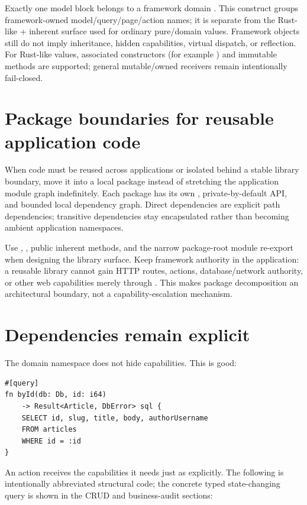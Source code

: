 Exactly one model block belongs to a framework domain . This construct groups framework-owned model/query/page/action names; it is separate from the Rust-like  + inherent  surface used for ordinary pure/domain values. Framework objects still do not imply inheritance, hidden capabilities, virtual dispatch, or reflection. For Rust-like values, associated constructors (for example ) and immutable  methods are supported; general mutable/owned receivers remain intentionally fail-closed.


\section{Package boundaries for reusable application code}

When code must be reused across applications or isolated behind a stable library boundary, move it into a local package instead of stretching the application module graph indefinitely. Each package has its own , private-by-default API, and bounded local dependency graph. Direct dependencies are explicit path dependencies; transitive dependencies stay encapsulated rather than becoming ambient application namespaces.

Use , , public inherent methods, and the narrow package-root module re-export when designing the library surface. Keep framework authority in the application: a reusable library cannot gain HTTP routes, actions, database/network authority, or other web capabilities merely through . This makes package decomposition an architectural boundary, not a capability-escalation mechanism.

\section{Dependencies remain explicit}

The domain namespace does not hide capabilities. This is good:

\begin{lstlisting}[language=Velran]
#[query]
fn byId(db: Db, id: i64)
    -> Result<Article, DbError> sql {
    SELECT id, slug, title, body, authorUsername
    FROM articles
    WHERE id = :id
}
\end{lstlisting}

An action receives the capabilities it needs just as explicitly. The following is intentionally abbreviated structural code; the concrete typed state-changing query is shown in the CRUD and business-audit sections:

